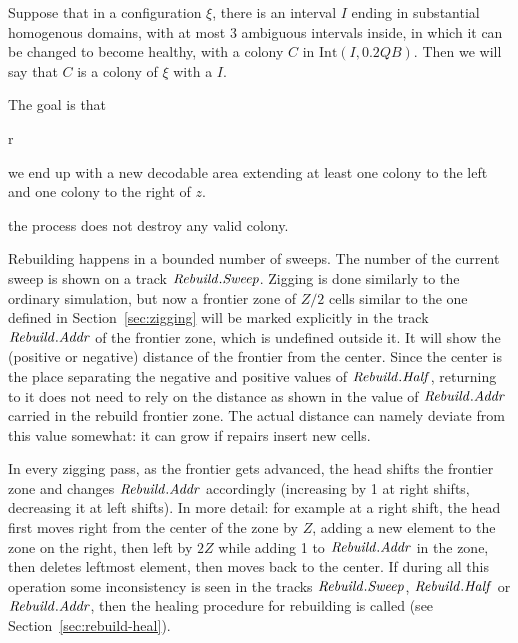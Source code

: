 \documentclass[11pt]{memoir}
\theoremstyle{definition} %
\newcommand{\fld}[1]{\ensuremath{\textit{#1\/}}}
\def\B{B}
\newcommand{\Int}{\mathrm{Int}} %
\newcommand{\Q}{Q} %
\newcommand{\Z}{Z} %
\newcommand{\z}{z} %
\newcommand{\Addr}{\fld{Addr}}
\newcommand{\Half}{\fld{Half}} %
\newcommand{\Rebuild}{\fld{Rebuild}} %
\newcommand{\Sweep}{\fld{Sweep}} %
\begin{document}
\begin{definition}\label{def:valid-colony}
  Suppose that in a configuration \( \xi \), there is an interval \( I \) 
  ending in substantial homogenous domains, with at
  most 3 ambiguous intervals inside, in which it can be changed
  to become healthy, with a colony \( C \) in \( \Int(I,0.2\Q\B) \).
  Then we will say that \( C \) is a  colony of \( \xi \) with a  \( I \).
\end{definition}

The goal is that
\begin{varenum}{r}
\item\label{i:rebuild.size} we end up with a new decodable area
  extending at least one colony to the left and one colony to the right of \( \z \).
\item\label{i:rebuild.keep-healthy} the process does not destroy any valid colony.
\end{varenum}

Rebuilding happens in a bounded number of sweeps. 
The number of the current sweep is shown on a track \( \Rebuild.\Sweep \).
Zigging is done similarly to the ordinary simulation,
but now a frontier zone of \( \Z/2 \) cells similar to the one defined in Section~\ref{sec:zigging} will
be marked explicitly in the track \( \Rebuild.\Addr \) of the frontier zone, which is undefined outside it.
It will show the (positive or negative) distance of the frontier from the center.
Since the center is the place separating the negative and positive values of \( \Rebuild.\Half \),
returning to it does not need to rely on the distance as shown in the
value of \( \Rebuild.\Addr \) carried in the rebuild frontier zone.
The actual distance can namely deviate from this value somewhat: it can grow
if repairs insert new cells.

In every zigging pass, as the frontier gets advanced, the head shifts the frontier zone
and changes \( \Rebuild.\Addr \) accordingly (increasing by 1 at right shifts, decreasing it
at left shifts).
In more detail: for example at a right shift, the head first moves right from the center of the
zone by \( \Z \), adding a new element to the zone on the right,
then left by \( 2\Z \) while adding 1 to \( \Rebuild.\Addr \) in the zone,
then deletes leftmost element, then moves back to the center.
If during all this operation some inconsistency is
seen in the tracks \( \Rebuild.\Sweep \), \( \Rebuild.\Half \) or \( \Rebuild.\Addr \),
then the healing procedure for rebuilding is called
(see Section~\ref{sec:rebuild-heal}).
\end{document}

